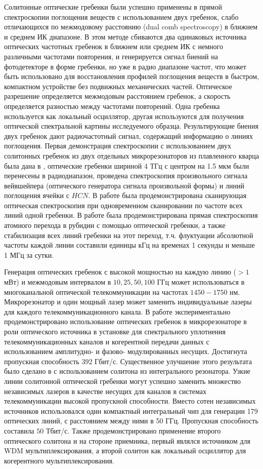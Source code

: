 Солитонные оптические гребенки были успешно применены в прямой спектроскопии поглощения веществ с использованием двух гребенок, слабо отличающихся по межмодовому расстоянию (dual comb spectroscopy) в ближнем \cite{Suh2016} и среднем ИК диапазоне\cite{Yu2018}. В этом методе сбиваются два одинаковых источника оптических частотных гребенок в ближнем или среднем ИК с немного различными частотами повторения, и генерируется сигнал биений на фотодетекторе в форме гребенки, но уже в радио диапазоне частот, что может быть использовано для восстановления профилей поглощения веществ в быстром, компактном устройстве без подвижных механических частей. Оптическое разрешение определяется межмодовым расстоянием гребенок, а скорость определяется разностью между частотами повторений. Одна гребенка используется как локальный осциллятор, другая используются для получения оптической спектральной картины исследуемого образца. Результирующие биения двух гребенок дают радиочастотный сигнал, содержащий информацию о линиях поглощения. Первая демонстрация спектроскопии с использованием двух солитонных гребенок из двух отдельных микрорезонаторов из плавленного кварца была дана в \cite{Suh2016}, оптические гребенки шириной 4 ТГц с центром на 1.5 мкм были перенесены в радиодиапазон, проведена спектроскопия произвольного сигнала вейвшейпера (оптического генератора сигнала произвольной формы) и линий поглощения ячейки с $HCN$. В работе \cite{Yu:17} была продемонстрирована сканирующая оптическая спектроскопия при одновременном сканировании по частоте всех линий одной гребенки. В работе \cite{2018arXiv181209789S} была продемонстрирована прямая спектроскопия атомного перехода в рубидии с помощью оптической гребенки, а также стабилизация всех линий гребенки на этот переход, т.ч. флуктуации абсолютной частоты каждой линии составили единицы кГц на временах 1 секунды и меньше 1 МГц за сутки.

Генерация оптических гребенок с высокой мощностью на каждую линию ($>1$ мВт) и межмодовым интервалом в $10,25,50,100$ ГГц может использоваться в многоканальной оптической телекоммуникации на частотах $1450-1750$ нм. Микрорезонатор и один мощный лазер может заменить индивидуальные лазеры для каждого телекоммуникационного канала. В работе \cite{Pfeifle2014} экспериментально продемонстрировано использование оптических гребенок в микрорезонаторе в роли оптического источника в установке для спектрального уплотнения телекоммуникационных каналов и когерентной передачи данных с использованием амплитудно- и фазово- модулированных несущих. Достигнута пропускная способность $392$ Гбит/с. Существенное улучшение этого результата было сделано в \cite{MarinPalomo2017} с использованием солитона из интегрального резонатора. Узкие линии солитонной оптической гребенки могут успешно заменить множество независимых лазеров в качестве несущих для каналов в системах телекоммуникации высокой пропускной способности. Вместо сотен независимых источников использовался один компактный интегральный чип для генерации 179 оптических линий, с расстоянием между ними в 50 ГГц. Пропускная способность составила $50$ Тбит/с. Также продемонстрировано применение второго оптического солитона и на стороне приемника, первый являлся источником для WDM мультиплексирования, а второй солитон как локальный осциллятор для когерентного мультиплексирования.

